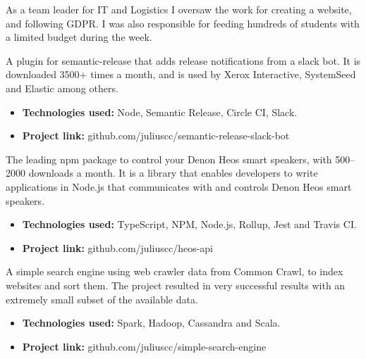 
As a team leader for IT and Logistics I oversaw the work for creating a website, and following GDPR. I was also responsible for feeding hundreds of students with a limited budget during the week.


A plugin for semantic-release that adds release notifications from a slack bot. It is downloaded 3500+ times a month, and is used by Xerox Interactive, SystemSeed and Elastic among others.

\vspace{6pt}

\begin{itemize}
    \item \textbf{Technologies used:} Node, Semantic Release, Circle CI, Slack.
    \item \textbf{Project link:} github.com/juliuscc/semantic-release-slack-bot
\end{itemize}

\divider


The leading npm package to control your Denon Heos smart speakers, with 500--2000 downloads a month. It is a library that enables developers to write applications in Node.js that communicates with and controls Denon Heos smart speakers.

\vspace{6pt}

\begin{itemize}
    \item \textbf{Technologies used:} TypeScript, NPM, Node.js, Rollup, Jest and Travis CI.
    \item \textbf{Project link:} github.com/juliuscc/heos-api
\end{itemize}

\divider

A simple search engine using web crawler data from Common Crawl, to index websites and sort them. The project resulted in very successful results with an extremely small subset of the available data.

\vspace{6pt}

\begin{itemize}
    \item \textbf{Technologies used:} Spark, Hadoop, Cassandra and Scala.
    \item \textbf{Project link:} github.com/juliuscc/simple-search-engine
\end{itemize}

